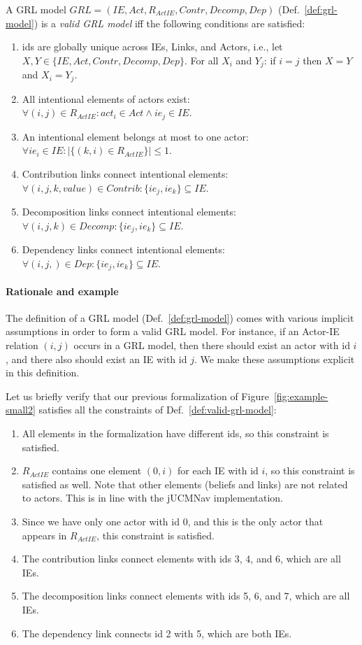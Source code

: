 \begin{definition}
\label{def:valid-grl-model}
A GRL model $GRL=(IE, Act, R_{ActIE}, Contr, Decomp, Dep)$ (Def.~\ref{def:grl-model}) is a \emph{valid GRL model} iff the following conditions are satisfied:
\begin{enumerate}
\item ids are globally unique across IEs, Links, and Actors, i.e., let $X,Y\in \{IE,Act, Contr, Decomp, Dep\}$. For all $X_i$ and $Y_j$: if $i=j$ then $X=Y$ and $X_i=Y_j$.
\item All intentional elements of actors exist: $\forall (i,j)\in R_{ActIE}: act_i \in Act \wedge ie_j \in IE$.
\item An intentional element belongs at most to one actor: $\forall ie_i\in IE: |\{(k,i)\in R_{ActIE}\}| \le 1$.
\item Contribution links connect intentional elements: $\forall (i,j,k,value)\in Contrib: \{ie_j,ie_k\}\subseteq IE$.
\item Decomposition links connect intentional elements: $\forall (i,j,k)\in Decomp: \{ie_j,ie_k\}\subseteq IE$.
\item Dependency links connect intentional elements: $\forall (i,j,)\in Dep: \{ie_j,ie_k\}\subseteq IE$.
\end{enumerate}
\end{definition}

\paragraph{Rationale and example} The definition of a GRL model (Def.~\ref{def:grl-model}) comes with various implicit assumptions in order to form a valid GRL model. For instance, if an Actor-IE relation $(i,j)$ occurs in a GRL model, then there should exist an actor with id $i$, and there also should exist an IE with id $j$. We make these assumptions explicit in this definition.

Let us briefly verify that our previous formalization of Figure~\ref{fig:example-small2} satisfies all the constraints of Def.~\ref{def:valid-grl-model}:
\begin{enumerate}
\item All elements in the formalization have different ids, so this constraint is satisfied.
\item $R_{ActIE}$ contains one element $(0,i)$ for each IE with id $i$, so this constraint is satisfied as well. Note that other elements (beliefs and links) are not related to actors. This is in line with the jUCMNav implementation.
\item Since we have only one actor with id 0, and this is the only actor that appears in $R_{ActIE}$, this constraint is satisfied.
\item The contribution links connect elements with ids 3, 4, and 6, which are all IEs.
\item The decomposition links connect elements with ids 5, 6, and 7, which are all IEs.
\item The dependency link connects id 2 with 5, which are both IEs.
\end{enumerate}

